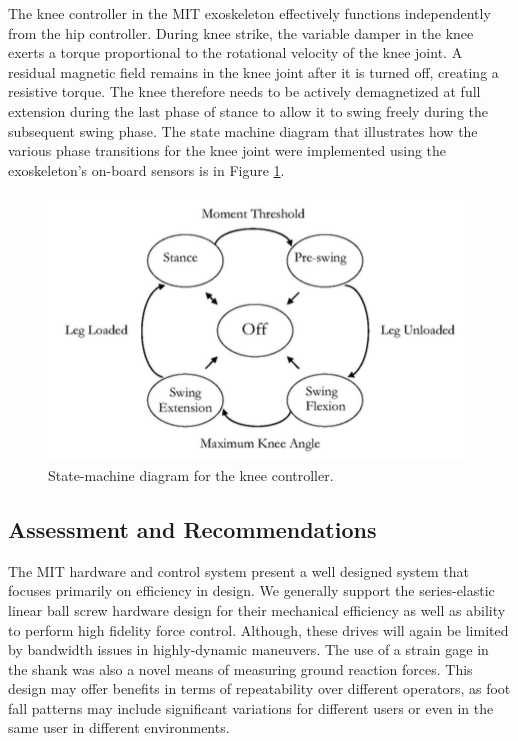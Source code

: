 \begin{refsection}
 The knee controller in the MIT exoskeleton effectively functions independently from the hip controller.  During knee strike, the variable damper in the knee exerts a torque proportional to the rotational velocity of the knee joint.  A residual magnetic field remains in the knee joint after it is turned off, creating a resistive torque.  The knee therefore needs to be actively demagnetized at full extension during the last phase of stance to allow it to swing freely during the subsequent swing phase.  The state machine diagram that illustrates how the various phase transitions for the knee joint were implemented using the exoskeleton's on-board sensors is in Figure \ref{fig:kneeControl}.
\begin{figure}[thpb]
\centering
\includegraphics[width=3.in]{exos/figs/MIT/kneeControl}
  \caption{State-machine diagram for the knee controller.}
 \label{fig:kneeControl} 
 \end{figure}  
  
  
% 
 
 
 \subsection{Assessment and Recommendations}
 
 The MIT hardware and control system present a well designed system that focuses primarily on efficiency in design.  We generally support the series-elastic linear ball screw hardware design for their mechanical efficiency as well as ability to perform high fidelity force control.  Although, these drives will again be limited by bandwidth issues in highly-dynamic maneuvers.  The use of a strain gage in the shank was also a novel means of measuring ground reaction forces.  This design may offer benefits in terms of repeatability over different operators, as foot fall patterns may include significant variations for different users or even in the same user in different environments.
 

\end{refsection}
